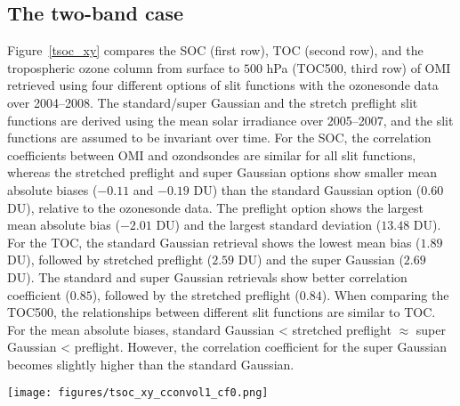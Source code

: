 \documentclass[amt,manuscript]{copernicus}
\begin{document}
\subsection{The two-band case}
Figure~\ref{tsoc_xy} compares the SOC (first row), TOC (second row), and the tropospheric ozone column from surface to $500$ hPa (TOC500, third row) of OMI retrieved using four different options of slit functions with the ozonesonde data over 2004--2008. The standard/super Gaussian and the stretch preflight slit functions are derived using the mean solar irradiance over 2005--2007, and the slit functions are assumed to be invariant over time. For the SOC, the correlation coefficients between OMI and ozondsondes are similar for all slit functions, whereas the stretched preflight and super Gaussian options show smaller mean absolute biases ($-0.11$ and $-0.19$ DU) than the standard Gaussian option ($0.60$ DU), relative to the ozonesonde data. The preflight option shows the largest mean absolute bias ($-2.01$ DU) and the largest standard deviation ($13.48$ DU). For the TOC, the standard Gaussian retrieval shows the lowest mean bias ($1.89$ DU), followed by stretched preflight ($2.59$ DU) and the super Gaussian ($2.69$ DU). The standard and super Gaussian retrievals show better correlation coefficient ($0.85$), followed by the stretched preflight ($0.84$). When comparing the TOC500, the relationships between different slit functions are similar to TOC. For the mean absolute biases, standard Gaussian < stretched preflight $\approx$ super Gaussian < preflight. However, the correlation coefficient for the super Gaussian becomes slightly higher than the standard Gaussian.

\begin{figure*}[tbhp]
\texttt{[image: figures/tsoc\_xy\_cconvol1\_cf0.png]}
\caption{Scatter plots of OMI retrieved ozone partial columns vs. the ozonesonde data for SOC (first row), TOC (second row), and TOC500 (third row). The four columns represent retrievals using standard Gaussian, super Gaussian, the preflight, and stretched preflight slit functions. The slope and offset of the linear regression, correlation coefficient (R), and the mean bias $\pm 1\sigma$ ($\Delta$) are shown for each subplot. The linear regressions are shown as red lines, and the black dash line is the 1:1 line. The number of successful validations is $4056$ (same as for all slit functions, see Fig.~\ref{xtrack_numbers}).}
\label{tsoc_xy}
\end{figure*}
\end{document}
